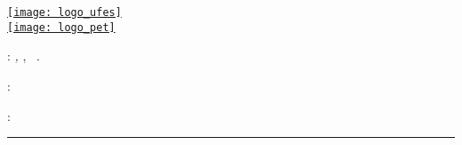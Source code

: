 \thispagestyle{empty}
{
	\centering
	\vspace{40pt}
	
	{\huge{}}
	\vspace{10pt}
	
	\href{http://www.ufes.br/}{\texttt{[image: logo\_ufes]}} \\ \vspace{20pt}
	\href{http://pet.inf.ufes.br/}{\texttt{[image: logo\_pet]}}
		
} 
\vfill
\noindent\myName:
\textit{\myTitle,} \mySubTitle,
\textcopyright\ \myTime.

\medskip
{}: \\
\myUrl

\medskip
{}: \\

\vspace{1cm}
\hrule
\bigskip